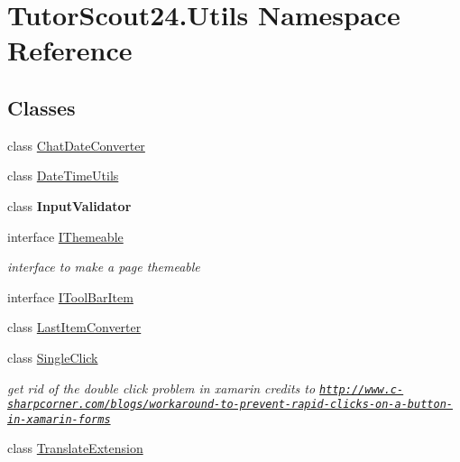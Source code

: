 \hypertarget{namespace_tutor_scout24_1_1_utils}{}\section{Tutor\+Scout24.\+Utils Namespace Reference}
\label{namespace_tutor_scout24_1_1_utils}
\subsection*{Classes}
\begin{DoxyCompactItemize}
\item 
class \mbox{\hyperlink{class_tutor_scout24_1_1_utils_1_1_chat_date_converter}{Chat\+Date\+Converter}}
\item 
class \mbox{\hyperlink{class_tutor_scout24_1_1_utils_1_1_date_time_utils}{Date\+Time\+Utils}}
\item 
class {\bfseries Input\+Validator}
\item 
interface \mbox{\hyperlink{interface_tutor_scout24_1_1_utils_1_1_i_themeable}{I\+Themeable}}
\begin{DoxyCompactList}\small\item\em interface to make a page themeable \end{DoxyCompactList}\item 
interface \mbox{\hyperlink{interface_tutor_scout24_1_1_utils_1_1_i_tool_bar_item}{I\+Tool\+Bar\+Item}}
\item 
class \mbox{\hyperlink{class_tutor_scout24_1_1_utils_1_1_last_item_converter}{Last\+Item\+Converter}}
\item 
class \mbox{\hyperlink{class_tutor_scout24_1_1_utils_1_1_single_click}{Single\+Click}}
\begin{DoxyCompactList}\small\item\em get rid of the double click problem in xamarin credits to \href{http://www.c-sharpcorner.com/blogs/workaround-to-prevent-rapid-clicks-on-a-button-in-xamarin-forms}{\tt http\+://www.\+c-\/sharpcorner.\+com/blogs/workaround-\/to-\/prevent-\/rapid-\/clicks-\/on-\/a-\/button-\/in-\/xamarin-\/forms} \end{DoxyCompactList}\item 
class \mbox{\hyperlink{class_tutor_scout24_1_1_utils_1_1_translate_extension}{Translate\+Extension}}
\end{DoxyCompactItemize}

